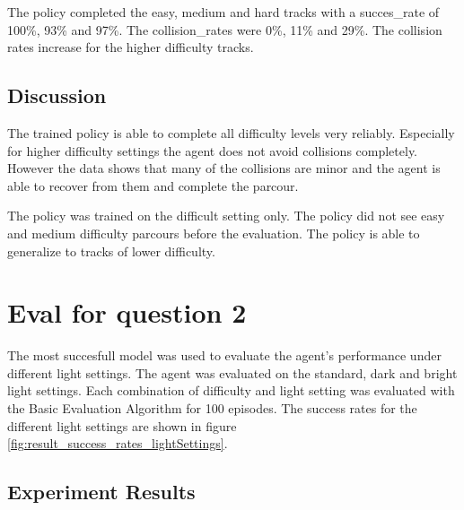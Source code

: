 The policy completed the easy, medium and hard tracks with a succes\_rate of 100\%, 93\% and 97\%. The collision\_rates were 0\%, 11\% and  29\%. The collision rates increase for the higher difficulty tracks.

\subsection{Discussion}

The trained policy is able to complete all difficulty levels very reliably.
Especially for higher difficulty settings the agent does not avoid collisions completely. However the data shows that many of the collisions are minor and the agent is able to recover from them and complete the parcour.

The policy was trained on the difficult setting only. The policy did not see easy and medium difficulty parcours before the evaluation. The policy is able to generalize to tracks of lower difficulty.

\section{Eval for question 2}

The most succesfull model was used to evaluate the agent's performance under different light settings. The agent was evaluated on the standard, dark and bright light settings. Each combination of difficulty and light setting was evaluated with the Basic Evaluation Algorithm for 100 episodes. The success rates for the different light settings are shown in figure \ref{fig:result_success_rates_lightSettings}.


\subsection{Experiment Results}

